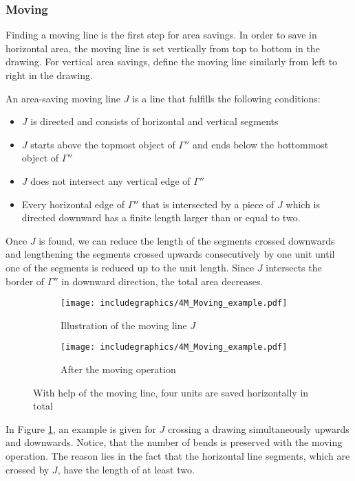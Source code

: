 \subsubsection*{Moving}
Finding a moving line is the first step for area savings. In order to save in horizontal area, the moving line is set vertically from top to bottom in the drawing. For vertical area savings, define the moving line similarly from left to right in the drawing.
\begin{definition}
	An area-saving moving line $J$ is a line that fulfills the following conditions:
	\begin{itemize}
		\item $J$ is directed and consists of horizontal and vertical segments
		\item $J$ starts above the topmost object of $\Gamma ''$ and ends below the bottommost object of $\Gamma ''$
		\item $J$ does not intersect any vertical edge of $\Gamma ''$
		\item Every horizontal edge of $\Gamma ''$ that is intersected by a piece of $J$ which is directed downward has a finite length larger than or equal to two.
	\end{itemize}
\end{definition}
Once $J$ is found, we can reduce the length of the segments crossed downwards and lengthening the segments crossed upwards consecutively by one unit until one of the segments is reduced up to the unit length. Since $J$ intersects the border of $\Gamma''$ in downward direction, the total area decreases.
\begin{figure}[H]
	\centering
	\begin{subfigure}{0.4\textwidth}
		\centering
		\texttt{[image: includegraphics/4M\_Moving\_example.pdf]}
		\caption{Illustration of the moving line $J$}
	\end{subfigure}
\begin{subfigure}{0.4\textwidth}
	\centering
	\texttt{[image: includegraphics/4M\_Moving\_example.pdf]}
	\caption{After the moving operation}
\end{subfigure}
\caption{With help of the moving line, four units are saved horizontally in total}\label{4M_ex2}
\end{figure}
In Figure \ref{4M_ex2}, an example is given for $J$ crossing a drawing simultaneously upwards and downwards. Notice, that the number of bends is preserved with the moving operation. The reason lies in the fact that the horizontal line segments, which are crossed by $J$, have the length of at least two.
